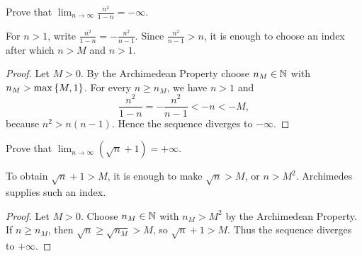 \begin{example}
    Prove that $\lim_{n\to\infty}\frac{n^2}{1-n}=-\infty$.
\end{example}
\begin{scratch}
    For $n>1$, write $\frac{n^2}{1-n}=-\frac{n^2}{n-1}$. Since $\frac{n^2}{n-1}>n$, it is enough to choose an index after which $n>M$ and $n>1$.
\end{scratch}
\begin{proof}
    Let $M>0$. By the Archimedean Property choose $n_M\in\mathbb{N}$ with $n_M>\max\left\{M,1\right\}$. For every $n\geq n_M$, we have $n>1$ and
    \[
        \frac{n^2}{1-n}=-\frac{n^2}{n-1}<-n<-M,
    \]
    because $n^2>n(n-1)$. Hence the sequence diverges to $-\infty$.
\end{proof}

\begin{example}
    Prove that $\lim_{n\to\infty}(\sqrt n+1)=+\infty$.
\end{example}
\begin{scratch}
    To obtain $\sqrt n+1>M$, it is enough to make $\sqrt n>M$, or $n>M^2$. Archimedes supplies such an index.
\end{scratch}
\begin{proof}
    Let $M>0$. Choose $n_M\in\mathbb{N}$ with $n_M>M^2$ by the Archimedean Property. If $n\geq n_M$, then $\sqrt n\geq\sqrt{n_M}>M$, so $\sqrt n+1>M$. Thus the sequence diverges to $+\infty$.
\end{proof}

